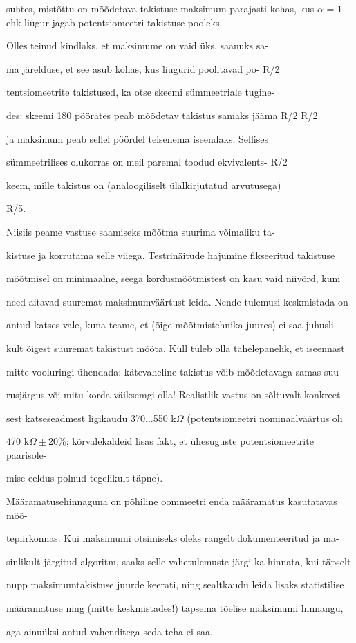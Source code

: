 suhtes, mistõttu on mõõdetava takistuse maksimum parajasti kohas, kus $\alpha$ = 1 ehk liugur jagab potentsiomeetri takistuse pooleks.

Olles teinud kindlaks, et maksimume on vaid üks, saanuks sa-

ma järelduse, et see asub kohas, kus liugurid poolitavad po- R/2

tentsiomeetrite takistused, ka otse skeemi sümmeetriale tugine-

des: skeemi 180 pöörates peab mõõdetav takistus samaks jääma R/2 R/2

ja maksimum peab sellel pöördel teisenema iseendaks. Sellises

sümmeetrilises olukorras on meil paremal toodud ekvivalents- R/2

keem, mille takistus on (analoogiliselt ülalkirjutatud arvutusega)

R/5.

Niisiis peame vastuse saamiseks mõõtma suurima võimaliku ta-

kistuse ja korrutama selle viiega. Testrinäitude hajumine fikseeritud takistuse

mõõtmisel on minimaalne, seega kordusmõõtmistest on kasu vaid niivõrd, kuni

need aitavad suuremat maksimumväärtust leida. Nende tulemusi keskmistada on

antud katses vale, kuna teame, et (õige mõõtmistehnika juures) ei saa juhusli-

kult õigest suuremat takistust mõõta. Küll tuleb olla tähelepanelik, et iseennast

mitte vooluringi ühendada: kätevaheline takistus võib mõõdetavaga samas suu-

rusjärgus või mitu korda väiksemgi olla! Realistlik vastus on sõltuvalt konkreet-

sest katseseadmest ligikaudu 370...550 k$\Omega$ (potentsiomeetri nominaalväärtus oli

470 k$\Omega\pm$20\%; kõrvalekaldeid lisas fakt, et ühesuguste potentsiomeetrite paarisole-

mise eeldus polnud tegelikult täpne).

Määramatusehinnaguna on põhiline oommeetri enda määramatus kasutatavas mõõ-

tepiirkonnas. Kui maksimumi otsimiseks oleks rangelt dokumenteeritud ja ma-

sinlikult järgitud algoritm, saaks selle vahetulemuste järgi ka hinnata, kui täpselt

nupp maksimumtakistuse juurde keerati, ning sealtkaudu leida lisaks statistilise

määramatuse ning (mitte keskmistades!) täpsema tõelise maksimumi hinnangu,

aga ainuüksi antud vahenditega seda teha ei saa.
\probend
